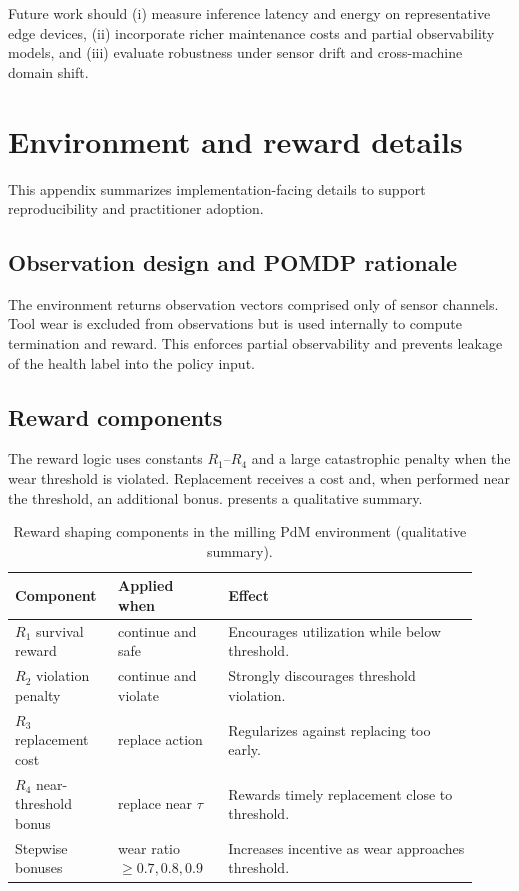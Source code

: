 \documentclass[11pt]{article}
\begin{document}
Future work should (i) measure inference latency and energy on representative edge devices, (ii) incorporate richer maintenance costs and partial observability models, and (iii) evaluate robustness under sensor drift and cross-machine domain shift.

\appendix
\section{Environment and reward details}
\label{app:env_reward}
This appendix summarizes implementation-facing details to support reproducibility and practitioner adoption.

\subsection{Observation design and POMDP rationale}
The environment returns observation vectors comprised only of sensor channels. Tool wear is excluded from observations but is used internally to compute termination and reward. This enforces partial observability and prevents leakage of the health label into the policy input.

\subsection{Reward components}
The reward logic uses constants $R_1$--$R_4$ and a large catastrophic penalty when the wear threshold is violated. Replacement receives a cost and, when performed near the threshold, an additional bonus.  presents a qualitative summary.

\begin{table}[t]
	\centering
	\caption{Reward shaping components in the milling PdM environment (qualitative summary).}
	\label{tab:reward_components}
	\begin{tabular}{p{0.20\linewidth} p{0.22\linewidth} p{0.50\linewidth}}
		\toprule
		\rowcolor{gray!20} \textbf{Component} & \textbf{Applied when} & \textbf{Effect}\\
		\midrule
		$R_1$ survival reward & continue and safe & Encourages utilization while below threshold.\\
		$R_2$ violation penalty & continue and violate & Strongly discourages threshold violation.\\
		$R_3$ replacement cost & replace action & Regularizes against replacing too early.\\
		$R_4$ near-threshold bonus & replace near $\tau$ & Rewards timely replacement close to threshold.\\
		Stepwise bonuses & wear ratio \,$\ge 0.7,0.8,0.9$ & Increases incentive as wear approaches threshold.\\
		\bottomrule
	\end{tabular}
\end{table}
\end{document}
